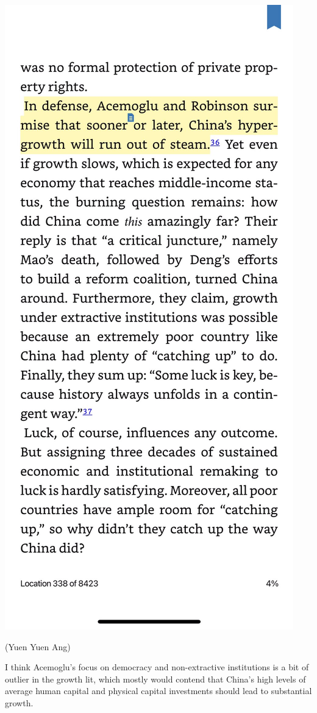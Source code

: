 \documentclass[
]{book}
\begin{document}
\includegraphics{fig/chinagrowth2.jpeg}

(Yuen Yuen Ang)

I think Acemoglu's focus on democracy and non-extractive institutions is a bit of outlier in the growth lit, which mostly would contend that China's high levels of average human capital and physical capital investments should lead to substantial growth.
\end{document}
